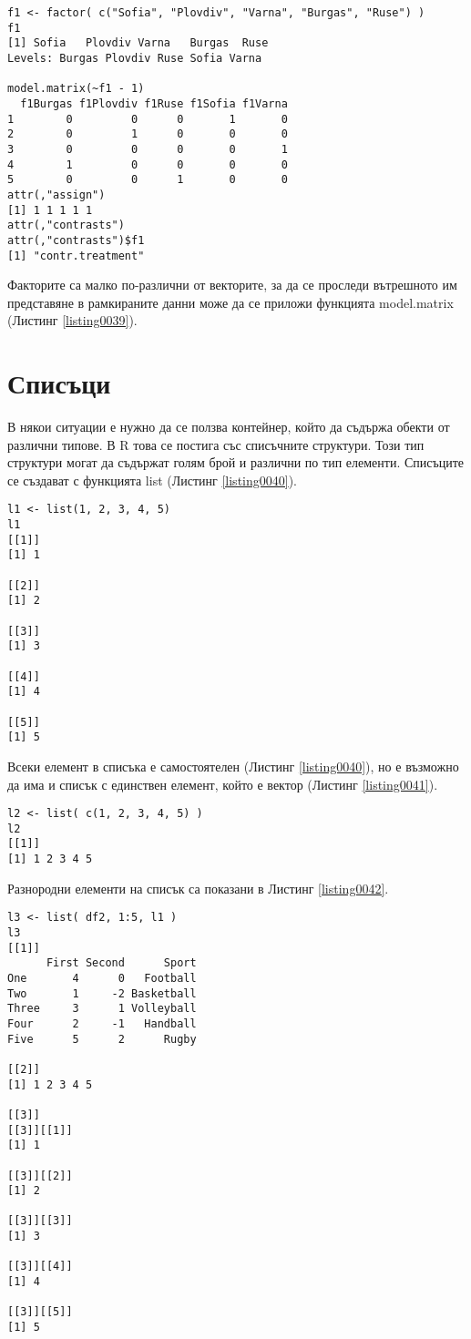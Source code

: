 \begin{lstlisting}[caption=Вътрешно представяне на факторите, label=listing0039]
f1 <- factor( c("Sofia", "Plovdiv", "Varna", "Burgas", "Ruse") )
f1
[1] Sofia   Plovdiv Varna   Burgas  Ruse   
Levels: Burgas Plovdiv Ruse Sofia Varna

model.matrix(~f1 - 1)
  f1Burgas f1Plovdiv f1Ruse f1Sofia f1Varna
1        0         0      0       1       0
2        0         1      0       0       0
3        0         0      0       0       1
4        1         0      0       0       0
5        0         0      1       0       0
attr(,"assign")
[1] 1 1 1 1 1
attr(,"contrasts")
attr(,"contrasts")$f1
[1] "contr.treatment"
\end{lstlisting}

Факторите са малко по-различни от векторите, за да се проследи вътрешното им представяне в рамкираните данни може да се приложи функцията model.matrix (Листинг \ref{listing0039}).

\section{Списъци}

В някои ситуации е нужно да се ползва контейнер, който да съдържа обекти от различни типове. В R това се постига със списъчните структури. Този тип структури могат да съдържат голям брой и различни по тип елементи. Списъците се създават с функцията list (Листинг \ref{listing0040}).

\begin{lstlisting}[caption=Създаване на списък, label=listing0040]
l1 <- list(1, 2, 3, 4, 5)
l1
[[1]]
[1] 1

[[2]]
[1] 2

[[3]]
[1] 3

[[4]]
[1] 4

[[5]]
[1] 5
\end{lstlisting}

Всеки елемент в списъка е самостоятелен (Листинг \ref{listing0040}), но е възможно да има и списък с единствен елемент, който е вектор (Листинг \ref{listing0041}).

\begin{lstlisting}[caption=Вектор в списък, label=listing0041]
l2 <- list( c(1, 2, 3, 4, 5) )
l2
[[1]]
[1] 1 2 3 4 5
\end{lstlisting}

Разнородни елементи на списък са показани в Листинг \ref{listing0042}.

\begin{lstlisting}[caption=Списък с разнородни данни, label=listing0042]
l3 <- list( df2, 1:5, l1 )
l3
[[1]]
      First Second      Sport
One       4      0   Football
Two       1     -2 Basketball
Three     3      1 Volleyball
Four      2     -1   Handball
Five      5      2      Rugby

[[2]]
[1] 1 2 3 4 5

[[3]]
[[3]][[1]]
[1] 1

[[3]][[2]]
[1] 2

[[3]][[3]]
[1] 3

[[3]][[4]]
[1] 4

[[3]][[5]]
[1] 5
\end{lstlisting}


